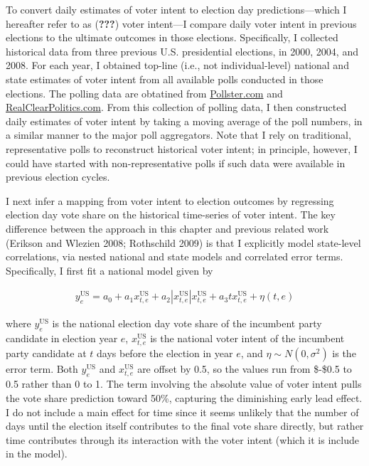 To convert daily estimates of voter intent to election day
predictions---which I hereafter refer to as ({\textbf{???}}) voter
intent---I compare daily voter intent in previous elections to the
ultimate outcomes in those elections. Specifically, I collected
historical data from three previous U.S. presidential elections, in
2000, 2004, and 2008. For each year, I obtained top-line (i.e., not
individual-level) national and state estimates of voter intent from all
available polls conducted in those elections. The polling data are
obtatined from \url{Pollster.com} and \url{RealClearPolitics.com}. From
this collection of polling data, I then constructed daily estimates of
voter intent by taking a moving average of the poll numbers, in a
similar manner to the major poll aggregators. Note that I rely on
traditional, representative polls to reconstruct historical voter
intent; in principle, however, I could have started with
non-representative polls if such data were available in previous
election cycles.

I next infer a mapping from voter intent to election outcomes by
regressing election day vote share on the historical time-series of
voter intent. The key difference between the approach in this chapter
and previous related work (Erikson and Wlezien 2008; Rothschild 2009) is
that I explicitly model state-level correlations, via nested national
and state models and correlated error terms. Specifically, I first fit a
national model given by

\begin{align*}
  y^{\text{US}}_{e}=a_0+a_1 x^{\text{US}}_{t,e}+
  a_2|x^{\text{US}}_{t,e}|x^{\text{US}}_{t,e} +
  a_3tx^{\text{US}}_{t,e} + \eta(t,e)
  \end{align*}

\noindent where \(y^{\text{US}}_{e}\) is the national election day vote
share of the incumbent party candidate in election year \(e\),
\(x^{\text{US}}_{t,e}\) is the national voter intent of the incumbent
party candidate at \(t\) days before the election in year \(e\), and
\(\eta \sim N(0,\sigma^2)\) is the error term. Both
\(y^{\text{US}}_{e}\) and \(x^{\text{US}}_{t,e}\) are offset by 0.5, so
the values run from \$-\$0.5 to 0.5 rather than 0 to 1. The term
involving the absolute value of voter intent pulls the vote share
prediction toward 50\%, capturing the diminishing early lead effect. I
do not include a main effect for time since it seems unlikely that the
number of days until the election itself contributes to the final vote
share directly, but rather time contributes through its interaction with
the voter intent (which it is include in the model).

